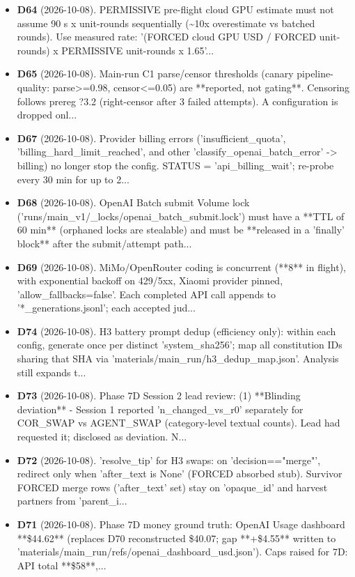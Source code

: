 \begin{itemize}
\item \textbf{D64} (2026-10-08). PERMISSIVE pre-flight cloud GPU estimate must not assume 90 s x unit-rounds sequentially (\textasciitilde{}10x overestimate vs batched rounds). Use measured rate: '(FORCED cloud GPU USD / FORCED unit-rounds) x PERMISSIVE unit-rounds x 1.65'...
\item \textbf{D65} (2026-10-08). Main-run C1 parse/censor thresholds (canary pipeline-quality: parse>=0.98, censor<=0.05) are **reported, not gating**. Censoring follows prereg ?3.2 (right-censor after 3 failed attempts). A configuration is dropped onl...
\item \textbf{D67} (2026-10-08). Provider billing errors ('insufficient\_quota', 'billing\_hard\_limit\_reached', and other 'classify\_openai\_batch\_error' -> billing) no longer stop the config. STATUS = 'api\_billing\_wait'; re-probe every 30 min for up to 2...
\item \textbf{D68} (2026-10-08). OpenAI Batch submit Volume lock ('runs/main\_v1/\_locks/openai\_batch\_submit.lock') must have a **TTL of 60 min** (orphaned locks are stealable) and must be **released in a 'finally' block** after the submit/attempt path...
\item \textbf{D69} (2026-10-08). MiMo/OpenRouter coding is concurrent (**8** in flight), with exponential backoff on 429/5xx, Xiaomi provider pinned, 'allow\_fallbacks=false'. Each completed API call appends to '*\_generations.jsonl'; each accepted jud...
\item \textbf{D74} (2026-10-08). H3 battery prompt dedup (efficiency only): within each config, generate once per distinct 'system\_sha256'; map all constitution IDs sharing that SHA via 'materials/main\_run/h3\_dedup\_map.json'. Analysis still expands t...
\item \textbf{D73} (2026-10-08). Phase 7D Session 2 lead review: (1) **Blinding deviation** - Session 1 reported 'n\_changed\_vs\_r0' separately for COR\_SWAP vs AGENT\_SWAP (category-level textual counts). Lead had requested it; disclosed as deviation. N...
\item \textbf{D72} (2026-10-08). 'resolve\_tip' for H3 swaps: on 'decision=="merge"', redirect only when 'after\_text is None' (FORCED absorbed stub). Survivor FORCED merge rows ('after\_text' set) stay on 'opaque\_id' and harvest partners from 'parent\_i...
\item \textbf{D71} (2026-10-08). Phase 7D money ground truth: OpenAI Usage dashboard **\$44.62** (replaces D70 reconstructed \$40.07; gap **+\$4.55** written to 'materials/main\_run/refs/openai\_dashboard\_usd.json'). Caps raised for 7D: API total **\$58**,...

\end{itemize}

